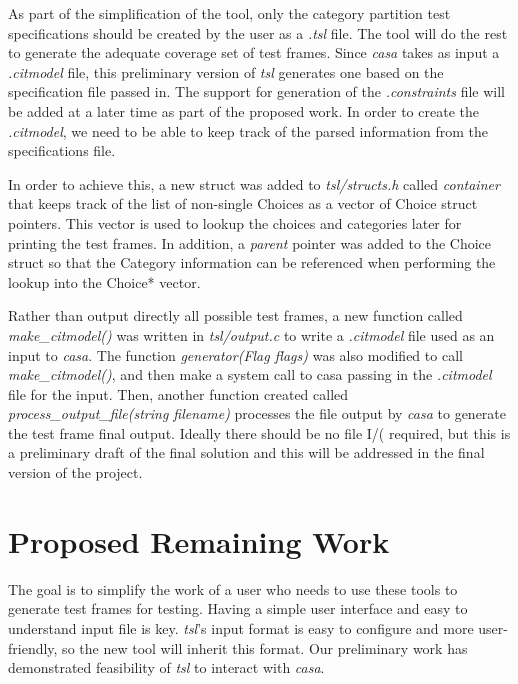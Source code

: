 \documentclass[a4full,12pt]{article}
\begin{document}
As part of the simplification of the tool, only the category partition test specifications
  should be created by the user as a \emph{.tsl} file. The tool will do the rest to
  generate the adequate coverage set of test frames. Since \emph{casa} takes as input a 
  \emph{.citmodel} file, this preliminary version of \emph{tsl} generates one based on the
  specification file passed in. The support for generation of the \emph{.constraints} file will be added
  at a later time as part of the proposed work. In order to create the \emph{.citmodel}, we need
  to be able to keep track of the parsed information from the specifications file.
  
In order to achieve this, a new struct was added to \emph{tsl/structs.h} called \emph{container} that
  keeps track of the list of non-single Choices as a vector of Choice struct
  pointers. This vector is used to lookup the choices and categories later for
  printing the test frames. In addition, a \emph{parent} pointer was added to
  the Choice struct so that the Category information can be referenced when
  performing the lookup into the Choice* vector.
  
Rather than output directly all possible test frames, a new function called
  \emph{make\_citmodel()} was written in \emph{tsl/output.c} to write a 
  \emph{.citmodel} file used as an input to \emph{casa}. The function
  \emph{generator(Flag flags)} was also modified to call \emph{make\_citmodel()},
  and then make a system call to casa passing in the \emph{.citmodel} file for
  the input. Then, another function created  called
  \emph{process\_output\_file(string filename)} processes the file output by
  \emph{casa} to generate the test frame final output. Ideally there should be
  no file I/( required, but this is a preliminary draft of the final solution
  and this will be addressed in the final version of the project.
  
  \section{Proposed Remaining Work}
The goal is to simplify the work of a user who needs to use these tools to generate test frames
  for testing. Having a simple user interface and easy to understand input file is key. \emph{tsl}'s
  input format is easy to configure and more user-friendly, so the new tool will inherit this format. Our preliminary work has demonstrated feasibility of \emph{tsl} to interact with \emph{casa}.
  
\end{document}
